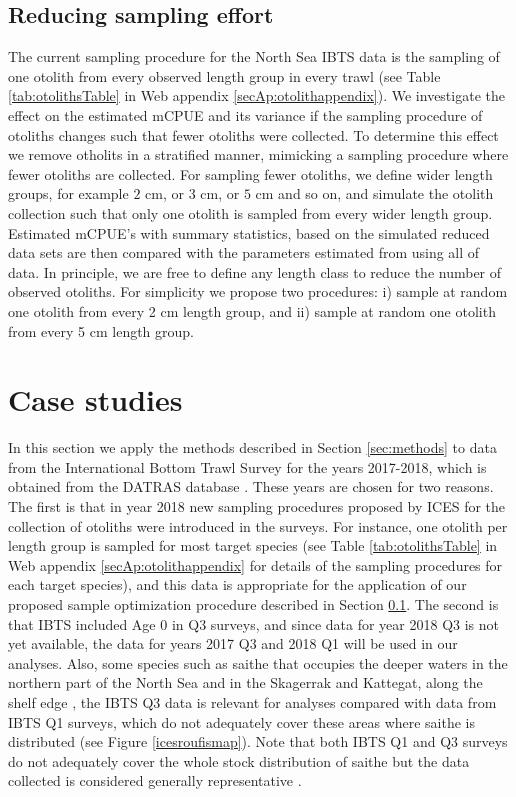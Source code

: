 \documentclass[a4paper 12pt]{article}
\numberwithin{equation}{section}
\begin{document}
\subsection{Reducing sampling effort}
\label{sec:optimizationsampling}

The current sampling procedure for the North Sea IBTS data is the sampling of one otolith from every observed length group in every trawl (see Table \ref{tab:otolithsTable} in Web appendix \ref{secAp:otolithappendix}). We investigate the effect on the estimated mCPUE and its variance if the sampling procedure of otoliths changes such that fewer otoliths were collected. To determine this effect we remove otholits in a stratified manner, mimicking a sampling procedure where fewer otoliths are collected. For sampling fewer otoliths, we define wider length groups, for example $2$ cm, or $3$ cm, or $5$ cm and so on,  and simulate the otolith  collection such that only one otolith is sampled from every wider length group. Estimated mCPUE's with summary statistics, based on the simulated reduced data sets are then compared with the parameters estimated from using all of data. In principle, we are free to define any length class to reduce the number of observed otoliths. For simplicity we propose two procedures: i) sample at random  one otolith from every 2 cm length group, and ii) sample at random one otolith from every 5 cm length group. 


\section{Case studies}
\label{sec:data}
In this section we apply the methods described in Section \ref{sec:methods} to data from the International Bottom Trawl Survey for the years 2017-2018, which is obtained from the DATRAS database \citep{datras}. These years are chosen for two reasons. The first is that in year 2018 new sampling procedures proposed by ICES for the collection of otoliths were introduced in the surveys. For instance, one otolith per length group is sampled for most target species (see Table \ref{tab:otolithsTable} in Web appendix \ref{secAp:otolithappendix} for details of the sampling procedures for each target species), and this data is appropriate for the application of our proposed sample optimization procedure described in Section \ref{sec:optimizationsampling}. The second is that IBTS included Age 0 in Q3 surveys, and since data for year 2018 Q3 is not yet available, the data for years 2017 Q3 and 2018 Q1 will be used in our analyses. Also, some species such as saithe that occupies the deeper waters in the northern part of the North Sea and in the Skagerrak and Kattegat, along the shelf edge \citep{ICESFishMaps}, the IBTS Q3 data is relevant for analyses compared with data from IBTS Q1 surveys, which do not adequately cover these areas where saithe is distributed (see Figure \ref{icesroufismap}). Note that both IBTS Q1 and Q3 surveys do not adequately cover the whole stock distribution of saithe but the data collected is considered generally representative \citep{ICESJune2016}.
\end{document}
